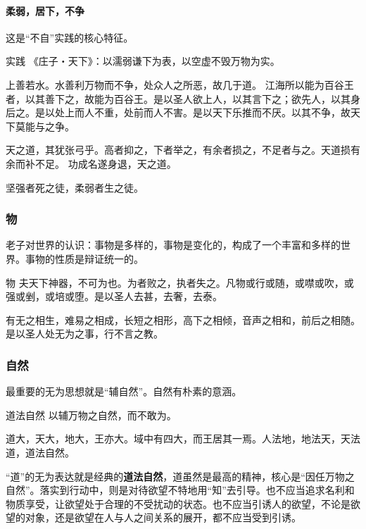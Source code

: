 \paragraph{柔弱，居下，不争}

这是“不自”实践的核心特征。

\begin{fancybox}{实践}
    《庄子‧天下》：以濡弱谦下为表，以空虚不毁万物为实。

    上善若水。水善利万物而不争，处众人之所恶，故几于道。
    江海所以能为百谷王者，以其善下之，故能为百谷王。是以圣人欲上人，以其言下之；欲先人，以其身后之。是以处上而人不重，处前而人不害。是以天下乐推而不厌。以其不争，故天下莫能与之争。

    天之道，其犹张弓乎。高者抑之，下者举之，有余者损之，不足者与之。天道损有余而补不足。
    功成名遂身退，天之道。

    坚强者死之徒，柔弱者生之徒。
\end{fancybox}

\subsubsection{物}

老子对世界的认识：事物是多样的，事物是变化的，构成了一个丰富和多样的世界。事物的性质是辩证统一的。

\begin{fancybox}{物}
    夫天下神器，不可为也。为者败之，执者失之。凡物或行或随，或噤或吹，或强或剉，或培或堕。是以圣人去甚，去奢，去泰。

    有无之相生，难易之相成，长短之相形，高下之相倾，音声之相和，前后之相随。是以圣人处无为之事，行不言之教。
\end{fancybox}

\subsubsection{自然}

最重要的无为思想就是“辅自然”。自然有朴素的意涵。

\begin{fancybox}{道法自然}
    以辅万物之自然，而不敢为。
    
    道大，天大，地大，王亦大。域中有四大，而王居其一焉。人法地，地法天，天法道，道法自然。
\end{fancybox}

“道”的无为表达就是经典的\textbf{道法自然}，道虽然是最高的精神，核心是“因任万物之自然”。落实到行动中，则是对待欲望不特地用“知”去引导。也不应当追求名利和物质享受，让欲望处于合理的不受扰动的状态。也不应当引诱人的欲望，不论是欲望的对象，还是欲望在人与人之间关系的展开，都不应当受到引诱。

